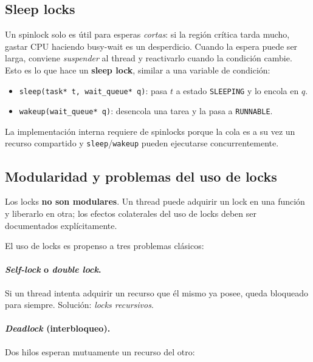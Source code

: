 \documentclass[11pt,a4paper]{article}
\begin{document}
\subsection{Sleep locks}

Un spinlock solo es útil para esperas \emph{cortas}: si la región
crítica tarda mucho, gastar CPU haciendo busy-wait es un desperdicio.
Cuando la espera puede ser larga, conviene \emph{suspender} al
thread y reactivarlo cuando la condición cambie. Esto es lo que hace
un \textbf{sleep lock}, similar a una variable de condición:

\begin{itemize}[leftmargin=*,nosep]
    \item \texttt{sleep(task* t, wait\_queue* q)}: pasa $t$ a estado
        \texttt{SLEEPING} y lo encola en $q$.
    \item \texttt{wakeup(wait\_queue* q)}: desencola una tarea y la
        pasa a \texttt{RUNNABLE}.
\end{itemize}

La implementación interna requiere de spinlocks porque la cola es a
su vez un recurso compartido y \texttt{sleep}/\texttt{wakeup} pueden
ejecutarse concurrentemente.

\subsection{Modularidad y problemas del uso de locks}

\begin{importante}
Los locks \textbf{no son modulares}. Un thread puede adquirir un
lock en una función y liberarlo en otra; los efectos colaterales del
uso de locks deben ser documentados explícitamente.
\end{importante}

El uso de locks es propenso a tres problemas clásicos:

\paragraph{\emph{Self-lock} o \emph{double lock}.} Si un thread
intenta adquirir un recurso que él mismo ya posee, queda bloqueado
para siempre. Solución: \emph{locks recursivos}.

\paragraph{\emph{Deadlock} (interbloqueo).} Dos hilos esperan
mutuamente un recurso del otro:
\end{document}
